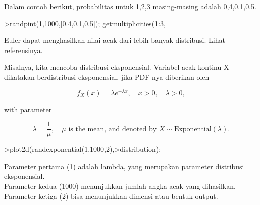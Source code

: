\documentclass[a4paper,10pt]{article}
\begin{document}
\begin{eulernotebook}
\begin{eulercomment}
\begin{eulercomment}
\begin{eulercomment}
Dalam contoh berikut, probabilitas untuk 1,2,3 masing-masing adalah
0,4,0.1,0.5.
\end{eulercomment}
\begin{eulerprompt}
>randpint(1,1000,[0.4,0.1,0.5]); getmultiplicities(1:3,%
\end{eulerprompt}
\begin{euleroutput}
  [378,  102,  520]
\end{euleroutput}
\begin{eulercomment}
Euler dapat menghasilkan nilai acak dari lebih banyak distribusi.
Lihat referensinya.

Misalnya, kita mencoba distribusi eksponensial. Variabel acak kontinu
X dikatakan berdistribusi eksponensial, jika PDF-nya diberikan oleh

\end{eulercomment}
\begin{eulerformula}
\[
f_X(x)=\lambda e^{-\lambda x},\quad x>0,\quad \lambda>0,
\]
\end{eulerformula}
\begin{eulercomment}
with parameter\\
\end{eulercomment}
\begin{eulerformula}
\[
\lambda=\frac{1}{\mu},\quad \mu \text{ is the mean, and denoted by } X \sim \text{Exponential}(\lambda).
\]
\end{eulerformula}
\begin{eulerprompt}
>plot2d(randexponential(1,1000,2),>distribution):
\end{eulerprompt}
\begin{eulercomment}
Parameter pertama (1) adalah lambda, yang merupakan parameter
distribusi eksponensial.\\
Parameter kedua (1000) menunjukkan jumlah angka acak yang dihasilkan.\\
Parameter ketiga (2) bisa menunjukkan dimensi atau bentuk output.


\end{eulercomment}
\end{eulercomment}
\end{eulercomment}
\end{eulernotebook}
\end{document}
